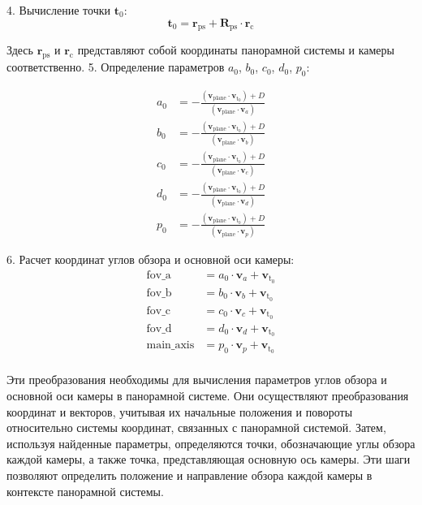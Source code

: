 4. Вычисление точки $ \mathbf{t}_0 $:
$$
\mathbf{t}_0 = \mathbf{r}_\text{ps} + \mathbf{R}_\text{ps} \cdot \mathbf{r}_\text{c}
$$

Здесь $ \mathbf{r}_\text{ps} $ и $ \mathbf{r}_\text{c} $ представляют собой координаты панорамной системы и камеры соответственно.
5. Определение параметров $a_0$, $b_0$, $c_0$, $d_0$, $p_0$:

\begin{align*}
a_0 &= -\frac{\left(\mathbf{v}_\text{plane} \cdot \mathbf{v}_{\text{t}_0}\right) + D} {\left(\mathbf{v}_\text{plane} \cdot \mathbf{v}_a\right)} \\
b_0 &= -\frac{\left(\mathbf{v}_\text{plane} \cdot \mathbf{v}_{\text{t}_0}\right) + D} {\left(\mathbf{v}_\text{plane} \cdot \mathbf{v}_b\right)} \\
c_0 &= -\frac{\left(\mathbf{v}_\text{plane} \cdot \mathbf{v}_{\text{t}_0}\right) + D}{\left(\mathbf{v}_\text{plane} \cdot \mathbf{v}_c\right)} \\
d_0 &= -\frac{\left(\mathbf{v}_\text{plane} \cdot \mathbf{v}_{\text{t}_0}\right) + D}{\left(\mathbf{v}_\text{plane} \cdot \mathbf{v}_d\right)} \\
p_0 &= -\frac{\left(\mathbf{v}_\text{plane} \cdot \mathbf{v}_{\text{t}_0}\right) + D}{\left(\mathbf{v}_\text{plane} \cdot \mathbf{v}_p\right)}
\end{align*}

6. Расчет координат углов обзора и основной оси камеры:
\begin{align*}
\text{fov\_a} &= a_0 \cdot \mathbf{v}_a + \mathbf{v}_{\text{t}_0} \\
\text{fov\_b} &= b_0 \cdot \mathbf{v}_b + \mathbf{v}_{\text{t}_0} \\ 
\text{fov\_c} &= c_0 \cdot \mathbf{v}_c + \mathbf{v}_{\text{t}_0} \\ 
\text{fov\_d} &= d_0 \cdot \mathbf{v}_d + \mathbf{v}_{\text{t}_0} \\ 
\text{main\_axis} &= p_0 \cdot \mathbf{v}_p + \mathbf{v}_{\text{t}_0} \\
\end{align*}

Эти преобразования необходимы для вычисления параметров углов обзора и основной оси камеры в панорамной системе. Они осуществляют преобразования координат и векторов, учитывая их начальные положения и повороты относительно системы координат, связанных с панорамной системой. Затем, используя найденные параметры, определяются точки, обозначающие углы обзора каждой камеры, а также точка, представляющая основную ось камеры. Эти шаги позволяют определить положение и направление обзора каждой камеры в контексте панорамной системы.


